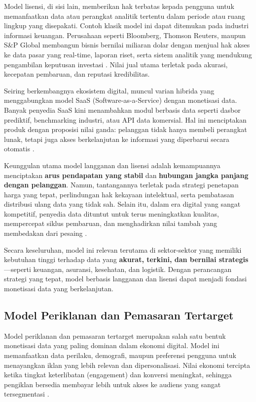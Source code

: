 Model lisensi, di sisi lain, memberikan hak terbatas kepada pengguna untuk memanfaatkan data atau perangkat analitik tertentu dalam periode atau ruang lingkup yang disepakati. Contoh klasik model ini dapat ditemukan pada industri informasi keuangan. Perusahaan seperti Bloomberg, Thomson Reuters, maupun S\&P Global membangun bisnis bernilai miliaran dolar dengan menjual hak akses ke data pasar yang real-time, laporan riset, serta sistem analitik yang mendukung pengambilan keputusan investasi \cite{dalle2017data}. Nilai jual utama terletak pada akurasi, kecepatan pembaruan, dan reputasi kredibilitas.

Seiring berkembangnya ekosistem digital, muncul varian hibrida yang menggabungkan model SaaS (Software-as-a-Service) dengan monetisasi data. Banyak penyedia SaaS kini menambahkan modul berbasis data seperti dasbor prediktif, benchmarking industri, atau API data komersial. Hal ini menciptakan produk dengan proposisi nilai ganda: pelanggan tidak hanya membeli perangkat lunak, tetapi juga akses berkelanjutan ke informasi yang diperbarui secara otomatis \cite{gupta2018aspects}. 

Keunggulan utama model langganan dan lisensi adalah kemampuannya menciptakan \textbf{arus pendapatan yang stabil} dan \textbf{hubungan jangka panjang dengan pelanggan}. Namun, tantangannya terletak pada strategi penetapan harga yang tepat, perlindungan hak kekayaan intelektual, serta pembatasan distribusi ulang data yang tidak sah. Selain itu, dalam era digital yang sangat kompetitif, penyedia data dituntut untuk terus meningkatkan kualitas, mempercepat siklus pembaruan, dan menghadirkan nilai tambah yang membedakan dari pesaing \cite{ott2019business}.

Secara keseluruhan, model ini relevan terutama di sektor-sektor yang memiliki kebutuhan tinggi terhadap data yang \textbf{akurat, terkini, dan bernilai strategis}—seperti keuangan, asuransi, kesehatan, dan logistik. Dengan perancangan strategi yang tepat, model berbasis langganan dan lisensi dapat menjadi fondasi monetisasi data yang berkelanjutan.

\subsection{Model Periklanan dan Pemasaran Tertarget}

Model periklanan dan pemasaran tertarget merupakan salah satu bentuk monetisasi data yang paling dominan dalam ekonomi digital. Model ini memanfaatkan data perilaku, demografi, maupun preferensi pengguna untuk menayangkan iklan yang lebih relevan dan dipersonalisasi. Nilai ekonomi tercipta ketika tingkat keterlibatan (engagement) dan konversi meningkat, sehingga pengiklan bersedia membayar lebih untuk akses ke audiens yang sangat tersegmentasi \cite{tucker2014social, bergemann2019data}.

